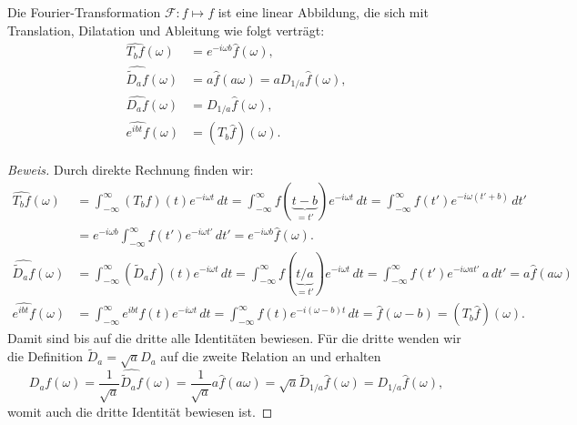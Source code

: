 \begin{satz}
\label{four-int:trans-dial}
Die Fourier-Transformation $\mathcal F\colon f\mapsto f$ ist eine linear
Abbildung, die sich mit Translation, Dilatation und Ableitung wie folgt
verträgt:
\begin{align*}
\widehat{T_bf}(\omega)
&=
e^{-i\omega b}\hat{f}(\omega),
\\
\widehat{\tilde{D}_af}(\omega)
&=
a \hat{f}(a\omega)
=
a D_{1/a} \hat{f}(\omega),
\\
\widehat{D_af}(\omega)
&=
D_{1/a}\hat{f}(\omega),
\\
\widehat{e^{ibt}f}(\omega)
&=
(T_b\hat{f})(\omega).
\end{align*}
\end{satz}

\begin{proof}[Beweis]
Durch direkte Rechnung finden wir:
\begin{align*}
\widehat{T_bf}(\omega)
&=
\int_{-\infty}^{\infty} (T_bf)(t)e^{-i\omega t}\,dt
=
\int_{-\infty}^{\infty} f(\underbrace{t-b}_{\displaystyle=t'})e^{-i\omega t}\,dt
=
\int_{-\infty}^{\infty} f(t')e^{-i\omega(t'+b)}\,dt'
\\
&=
e^{-i\omega b}
\int_{-\infty}^{\infty} f(t')e^{-i\omega t'}\,dt'
=
e^{-i\omega b}\hat{f}(\omega).
\\
\widehat{\tilde{D}_af}(\omega)
&=
\int_{-\infty}^\infty (\tilde{D}_af)(t)e^{-i\omega t}\,dt
=
\int_{-\infty}^\infty f(\underbrace{t/a}_{\displaystyle=t'})e^{-i\omega t}\,dt
=
\int_{-\infty}^\infty f(t')e^{-i\omega at'}\,a\,dt'
=
a \hat{f}(a\omega)
\\
\widehat{e^{ibt}f}(\omega)
&=
\int_{-\infty}^\infty e^{ibt}f(t)e^{-i\omega t}\,dt
=
\int_{-\infty}^\infty f(t)e^{-i(\omega -b)t}\,dt
=
\hat{f}(\omega-b)
=
(T_b\hat{f})(\omega).
\end{align*}
Damit sind bis auf die dritte alle Identitäten bewiesen.
Für die dritte wenden wir die Definition $\tilde{D}_a = \sqrt{a}D_a$
auf die zweite Relation an und erhalten
\[
\widehat{D_af}(\omega)
=
\frac{1}{\sqrt{a}}
\widehat{\tilde{D}_af}(\omega)
=
\frac{1}{\sqrt{a}}
a\hat{f}(a\omega)
=
\sqrt{a} \tilde{D}_{1/a}\hat{f}(\omega)
=
D_{1/a}\hat{f}(\omega),
\]
womit auch die dritte Identität bewiesen ist.
\end{proof}

